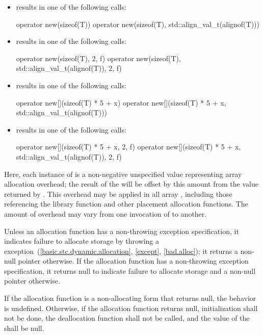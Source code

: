 \pnum
\begin{example}

\begin{itemize}
\item {} results in one of the following calls:
\begin{codeblock}
operator new(sizeof(T))
operator new(sizeof(T), std::align_val_t(alignof(T)))
\end{codeblock}
\item {} results in one of the following calls:
\begin{codeblock}
operator new(sizeof(T), 2, f)
operator new(sizeof(T), std::align_val_t(alignof(T)), 2, f)
\end{codeblock}
\item {} results in one of the following calls:
\begin{codeblock}
operator new[](sizeof(T) * 5 + x)
operator new[](sizeof(T) * 5 + x, std::align_val_t(alignof(T)))
\end{codeblock}
\item {} results in one of the following calls:
\begin{codeblock}
operator new[](sizeof(T) * 5 + x, 2, f)
operator new[](sizeof(T) * 5 + x, std::align_val_t(alignof(T)), 2, f)
\end{codeblock}
\end{itemize}
Here, each instance of  is a non-negative unspecified value
representing array allocation overhead; the result of the
 will be offset by this amount from the value
returned by . This overhead may be applied in all
array , including those referencing the
library function  and other
placement allocation functions. The amount of overhead may vary from one
invocation of  to another.
\end{example}

\pnum
\begin{note}
Unless an allocation function has a non-throwing
exception specification,
it indicates failure to allocate storage by throwing a
%
%
 exception~(\ref{basic.stc.dynamic.allocation},
\ref{except}, \ref{bad.alloc});
it returns a non-null pointer otherwise. If the allocation function
has a non-throwing exception specification,
it returns null to indicate failure to allocate storage
and a non-null pointer otherwise.
\end{note}
If the allocation function is a non-allocating
form that returns null,
the behavior is undefined.
Otherwise,
if the allocation function returns null, initialization shall not be
done, the deallocation function shall not be called, and the value of
the  shall be null.

